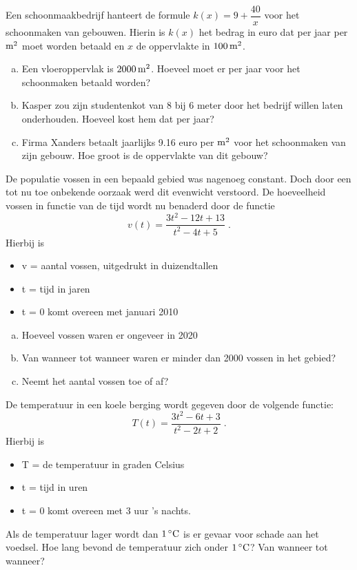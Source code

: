 \documentclass[12pt,twoside,a4paper]{article}
\begin{document}
\begin{oefening}
Een schoonmaakbedrijf hanteert de formule $k(x)=9+\dfrac{40}{x}$ voor het schoonmaken van gebouwen. Hierin is $k(x)$ het bedrag in euro dat per jaar per $\m^2$ moet worden betaald en $x$ de oppervlakte in $100 \m^2$.
\begin{enumerate}[(a)]
  \item Een vloeroppervlak is $2000 \m^2$. Hoeveel moet er per jaar voor het schoonmaken betaald worden?
  \item Kasper zou zijn studentenkot van 8 bij 6 meter door het bedrijf willen laten onderhouden. Hoeveel kost hem dat per jaar?
  \item Firma Xanders betaalt jaarlijks 9.16 euro per $\m^2$ voor het schoonmaken van zijn gebouw. Hoe groot is de oppervlakte van dit gebouw?
\end{enumerate}
\end{oefening}

\begin{oefening}
De populatie vossen in een bepaald gebied was nagenoeg constant. Doch door een tot nu toe onbekende oorzaak werd dit evenwicht verstoord. De hoeveelheid vossen in functie van de tijd wordt nu benaderd door de functie
$$v(t)=\dfrac{3t^2-12t+13}{t^2-4t+5}\;.$$
Hierbij is
\begin{itemize}
\item v = aantal vossen, uitgedrukt in duizendtallen
\item t = tijd in jaren
\item t = 0 komt overeen met januari 2010
\end{itemize}
\begin{enumerate}[(a)]
\item Hoeveel vossen waren er ongeveer in 2020
\item Van wanneer tot wanneer waren er minder dan 2000 vossen in het  gebied?
\item Neemt het aantal vossen toe of af?
\end{enumerate}
\end{oefening}

\begin{oefening}
De temperatuur in een koele berging wordt gegeven door de volgende functie:
$$T(t)=\dfrac{3t^2-6t+3}{t^2-2t+2}\;.$$
Hierbij is
\begin{itemize}
  \item T = de temperatuur in graden Celsius
  \item t = tijd in uren
  \item t = 0 komt overeen met 3 uur 's nachts.
\end{itemize}
Als de temperatuur lager wordt dan $1\grC$ is er gevaar voor schade aan het voedsel. Hoe lang bevond de temperatuur zich onder $1\grC$? Van wanneer tot wanneer?
\end{oefening}
\end{document}
